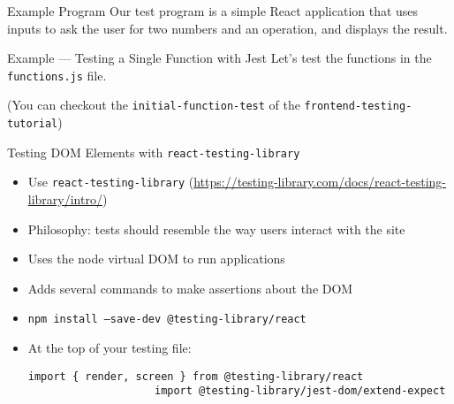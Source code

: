 \documentclass[t]{beamer}
\begin{document}
	\begin{frame}{Example Program}
		Our test program is a simple React application that uses inputs to ask the user for two numbers and an operation, and displays the result. 
	\end{frame}
	\begin{frame}{Example --- Testing a Single Function with Jest}
		Let's test the functions in the \texttt{functions.js} file.

		(You can checkout the \texttt{initial-function-test} of the \texttt{frontend-testing-tutorial})

		\framebreak

		
		


	\end{frame}

	\begin{frame}[fragile]{Testing DOM Elements with \texttt{react-testing-library}}
		\begin{itemize}
			\item Use \texttt{react-testing-library} (\url{https://testing-library.com/docs/react-testing-library/intro/})
			\item Philosophy: tests should resemble the way users interact with the site
			\item Uses the node virtual DOM to run applications
			\item Adds several commands to make assertions about the DOM 
			\item \texttt{npm install --save-dev @testing-library/react}
			\item At the top of your testing file:
				\begin{lstlisting}[autogobble]
					import { render, screen } from @testing-library/react 
					import @testing-library/jest-dom/extend-expect
				\end{lstlisting}
		\end{itemize}
	\end{frame}
\end{document}
